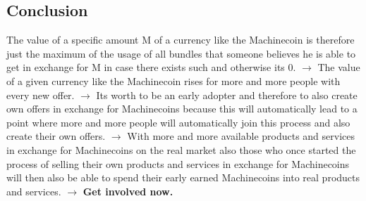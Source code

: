 \documentclass{beamer}
\begin{document}
\subsection{Conclusion}
\frame
{
The value of a specific amount M of a currency like the Machinecoin is therefore just the maximum of the usage of all bundles that someone believes he is able to get in exchange for M in case there exists such and otherwise its 0.
\newline
$\rightarrow$ The value of a given currency like the Machinecoin rises for more and more people with every new offer. 
\newline
$\rightarrow$ Its worth to be an early adopter and therefore to also create own offers in exchange for Machinecoins because this will automatically lead to a point where more and more people will automatically join this process and also create their own offers. 
\newline
$\rightarrow$ With more and more available products and services in exchange for Machinecoins on the real market also those who once started the process of selling their own products and services in exchange for Machinecoins will then also be able to spend their early earned Machinecoins into real products and services.  
\newline
$\rightarrow$ \textbf{Get involved now.}
}
\end{document}
